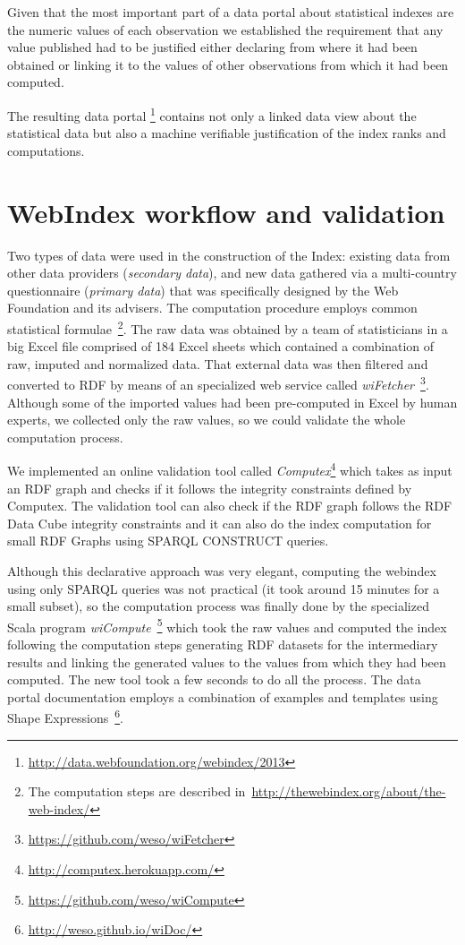 \documentclass{llncs}
\begin{document}
Given that the most important part of a data portal about statistical indexes are the 
numeric values of each observation we established the requirement that any value published had to be justified either declaring from where it had been obtained or
linking it to the values of other observations
from which it had been computed.

The resulting data portal \footnote{\url{http://data.webfoundation.org/webindex/2013}} contains not only a linked data view about
the statistical data but also a machine verifiable justification of the index ranks and computations.

\section{WebIndex workflow and validation}

Two types of data were used in the construction of the Index: existing data from other data providers (\emph{secondary data}), and new data gathered via a multi-country questionnaire (\emph{primary data}) 
that was specifically designed by the Web Foundation and its advisers. The computation procedure employs common statistical formulae~\footnote{The computation steps are described in~\url{http://thewebindex.org/about/the-web-index/}}. The raw data was obtained by a team of statisticians in a big Excel file comprised of 184 Excel sheets which contained a combination
 of raw, imputed and normalized data. 
That external data was then filtered and converted to RDF by means of an specialized web service called \emph{wiFetcher}~\footnote{\url{https://github.com/weso/wiFetcher}}. 
Although some of the imported values had been
 pre-computed in Excel by human experts, we collected only the raw values, so we could validate the whole computation process. 

We implemented an online validation tool called \emph{Computex}\footnote{\url{http://computex.herokuapp.com/}} which takes as
 input an RDF graph and checks if it follows the integrity constraints defined by Computex.
 The validation tool can also check if the RDF graph follows the RDF Data Cube integrity constraints
 and it can also do the index computation for small RDF Graphs using SPARQL CONSTRUCT queries. 

Although this declarative approach was very elegant, computing the webindex using only SPARQL queries was not practical (it took around 15 minutes for a small subset), so the computation process was finally done
  by the specialized Scala program \emph{wiCompute}~\footnote{\url{https://github.com/weso/wiCompute}} which took the raw values and computed the index following the
computation steps generating RDF datasets for the intermediary results and linking the generated values to the values from which they had been computed. The new tool took a few seconds to do all the process. 
The data portal documentation employs a combination of examples and templates using Shape Expressions~\footnote{\url{http://weso.github.io/wiDoc/}}. 
\end{document}
